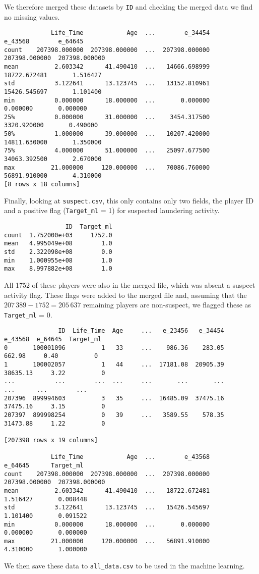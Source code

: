 \documentclass[11pt]{article} %
\begin{document}
We therefore merged these datasets by {\tt ID} and checking the merged data we find no missing values.
\small
{\color{blue}
\begin{verbatim} 
             Life_Time            Age  ...        e_34454        e_43568        e_64645
count    207398.000000  207398.000000  ...  207398.000000  207398.000000  207398.000000
mean          2.603342      41.490410  ...   14666.698999   18722.672481       1.516427
std           3.122641      13.123745  ...   13152.810961   15426.545697       1.101400
min           0.000000      18.000000  ...       0.000000       0.000000       0.000000
25%           0.000000      31.000000  ...    3454.317500    3320.920000       0.490000
50%           1.000000      39.000000  ...   10207.420000   14811.630000       1.350000
75%           4.000000      51.000000  ...   25097.677500   34063.392500       2.670000
max          21.000000     120.000000  ...   70086.760000   56891.910000       4.310000
[8 rows x 18 columns]
\end{verbatim}
}
\normalsize


Finally, looking at {\tt suspect.csv}, this only contains only two fields,
the player ID and a positive flag ({\tt Target\_ml} = 1) for suspected laundering activity.
\small
{\color{blue}
\begin{verbatim} 
                 ID  Target_ml
count  1.752000e+03     1752.0
mean   4.995049e+08        1.0
std    2.322098e+08        0.0
min    1.000955e+08        1.0
max    8.997882e+08        1.0
\end{verbatim}
}
\normalsize
All 1752 of these players were also in the merged file, which was absent a suspect activity flag.
These flags were added to
the merged file and, assuming that the $207\,389-1752 = 205\,637$
remaining players are non-suspect, we flagged these as {\tt Target\_ml} = 0.
\small
{\color{blue}
\begin{verbatim}
               ID  Life_Time  Age     ...   e_23456   e_34454   e_43568  e_64645  Target_ml
0       100001096          1   33     ...    986.36    283.05    662.98     0.40          0
1       100002057          1   44     ...  17181.08  20905.39  38635.13     3.22          0
...           ...        ...  ...     ...       ...       ...       ...      ...        ...
207396  899994603          3   35     ...  16485.09  37475.16  37475.16     3.15          0
207397  899998254          0   39     ...   3589.55    578.35  31473.88     1.22          0

[207398 rows x 19 columns]

             Life_Time            Age  ...        e_43568        e_64645      Target_ml
count    207398.000000  207398.000000  ...  207398.000000  207398.000000  207398.000000
mean          2.603342      41.490410  ...   18722.672481       1.516427       0.008448
std           3.122641      13.123745  ...   15426.545697       1.101400       0.091522
min           0.000000      18.000000  ...       0.000000       0.000000       0.000000
max          21.000000     120.000000  ...   56891.910000       4.310000       1.000000
\end{verbatim}
}
\normalsize
We then save these data to  {\tt all\_data.csv} to be used in the machine learning.
\end{document}
